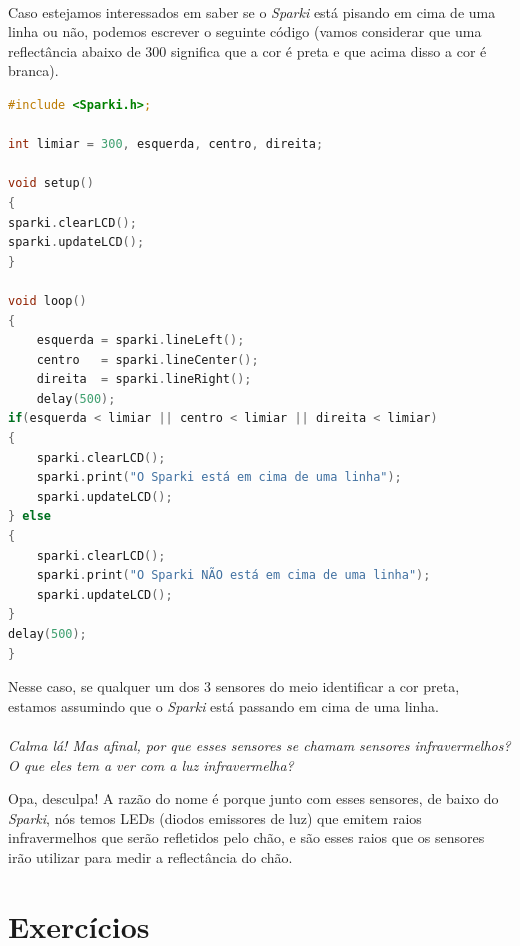 \paragraph{}
Caso estejamos interessados em saber se o \textit{Sparki} está pisando em cima de uma linha ou não, podemos escrever o seguinte código (vamos considerar que uma reflectância abaixo de 300 significa que a cor é preta e que acima disso a cor é branca).

    \begin{lstlisting}[language=C]
#include <Sparki.h>;

int limiar = 300, esquerda, centro, direita;

void setup()
{
sparki.clearLCD();
sparki.updateLCD();
}

void loop()
{
    esquerda = sparki.lineLeft();
    centro   = sparki.lineCenter();
    direita  = sparki.lineRight();
    delay(500);
if(esquerda < limiar || centro < limiar || direita < limiar)
{
    sparki.clearLCD();
    sparki.print("O Sparki está em cima de uma linha");
    sparki.updateLCD();
} else
{
    sparki.clearLCD();
    sparki.print("O Sparki NÃO está em cima de uma linha");
    sparki.updateLCD();
}
delay(500);
}
\end{lstlisting}

Nesse caso, se qualquer um dos 3 sensores do meio identificar a cor preta, estamos assumindo que o \textit{Sparki} está passando em cima de uma linha.
\\~\\
\textit{Calma lá! Mas afinal, por que esses sensores se chamam sensores infravermelhos? O que eles tem a ver com a luz infravermelha?} \par
Opa, desculpa! A razão do nome é porque junto com esses sensores, de baixo do \textit{Sparki}, nós temos LEDs (diodos emissores de luz) que emitem raios infravermelhos que serão refletidos pelo chão, e são esses raios que os sensores irão utilizar para medir a reflectância do chão.

\section{Exercícios}


